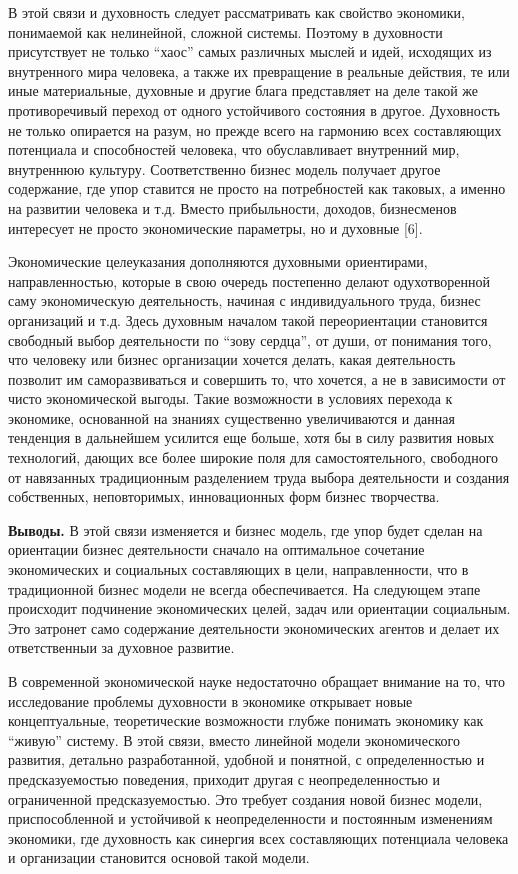 \begin{multicols}{2}
В этой связи и духовность следует рассматривать как свойство экономики,
понимаемой как нелинейной, сложной системы. Поэтому в духовности
присутствует не только ``хаос'' самых различных мыслей и идей, исходящих
из внутренного мира человека, а также их превращение в реальные
действия, те или иные материальные, духовные и другие блага представляет
на деле такой же противоречивый переход от одного устойчивого состояния
в другое. Духовность не только опирается на разум, но прежде всего на
гармонию всех составляющих потенциала и способностей человека, что
обуславливает внутренний мир, внутреннюю культуру. Соответственно бизнес
модель получает другое содержание, где упор ставится не просто на
потребностей как таковых, а именно на развитии человека и т.д. Вместо
прибыльности, доходов, бизнесменов интересует не просто экономические
параметры, но и духовные {[}6{]}.

Экономические целеуказания дополняются духовными ориентирами,
направленностью, которые в свою очередь постепенно делают одухотворенной
саму экономическую деятельность, начиная с индивидуального труда, бизнес
организаций и т.д. Здесь духовным началом такой переориентации
становится свободный выбор деятельности по ``зову сердца'', от души, от
понимания того, что человеку или бизнес организации хочется делать,
какая деятельность позволит им саморазвиваться и совершить то, что
хочется, а не в зависимости от чисто экономической выгоды. Такие
возможности в условиях перехода к экономике, основанной на знаниях
существенно увеличиваются и данная тенденция в дальнейшем усилится еще
больше, хотя бы в силу развития новых технологий, дающих все более
широкие поля для самостоятельного, свободного от навязанных традиционным
разделением труда выбора деятельности и создания собственных,
неповторимых, инновационных форм бизнес творчества.

{\bfseries Выводы.} В этой связи изменяется и бизнес модель, где упор будет
сделан на ориентации бизнес деятельности сначало на оптимальное
сочетание экономических и социальных составляющих в цели,
направленности, что в традиционной бизнес модели не всегда
обеспечивается. На следующем этапе происходит подчинение экономических
целей, задач или ориентации социальным. Это затронет само содержание
деятельности экономических агентов и делает их ответственныи за духовное
развитие.

В современной экономической науке недостаточно обращает внимание на то,
что исследование проблемы духовности в экономике открывает новые
концептуальные, теоретические возможности глубже понимать экономику как
``живую'' систему. В этой связи, вместо линейной модели экономического
развития, детально разработанной, удобной и понятной, с определенностью
и предсказуемостью поведения, приходит другая с неопределенностью и
ограниченной предсказуемостью. Это требует создания новой бизнес модели,
приспособленной и устойчивой к неопределенности и постоянным изменениям
экономики, где духовность как синергия всех составляющих потенциала
человека и организации становится основой такой модели.
\end{multicols}

